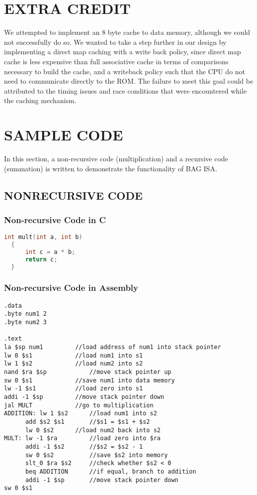 \documentclass[11pt, titlepage]{article}
\begin{document}
\section{EXTRA CREDIT}
We attempted to implement an 8 byte cache to data memory, although we could not successfully do so. We wanted to take a step further in our design by implementing a direct map caching with a write back policy, since direct map cache is less expensive than full associative cache in terms of comparisons necessary to build the cache, and a writeback policy such that the CPU do not need to communicate directly to the ROM. The failure to meet this goal could be attributed to the timing issues and race conditions that were encountered while the caching mechanism.

\newpage
\section{SAMPLE CODE}
In this section, a non-recursive code (multiplication) and a recursive code (summation) is written to demonstrate the functionality of BAG ISA.

\subsection{NONRECURSIVE CODE}
\subsubsection{Non-recursive Code in C}
\begin{lstlisting}[language = C]
int mult(int a, int b)
  {
      int c = a * b;
      return c;
  }

\end{lstlisting}
\subsubsection{Non-recursive Code in Assembly}
\begin{lstlisting}[language=Ant]
.data 
.byte num1 2
.byte num2 3

.text
la $sp num1			//load address of num1 into stack pointer
lw 0 $s1			//load num1 into s1 
lw 1 $s2			//load num2 into s2
nand $ra $sp			//move stack pointer up
sw 0 $s1			//save num1 into data memory
lw -1 $s1			//load zero into s1
addi -1 $sp			//move stack pointer down
jal MULT			//go to multiplication
ADDITION: lw 1 $s2		//load num1 into s2
	  add $s2 $s1		//$s1 = $s1 + $s2
	  lw 0 $s2		//load num2 back into s2
MULT: lw -1 $ra			//load zero into $ra
      addi -1 $s2		//$s2 = $s2 - 1
      sw 0 $s2			//save $s2 into memory
      slt_0 $ra $s2		//check whether $s2 < 0
      beq ADDITION		//if equal, branch to addition
      addi -1 $sp		//move stack pointer down
sw 0 $s1


\end{lstlisting}
\newpage
\end{document}
